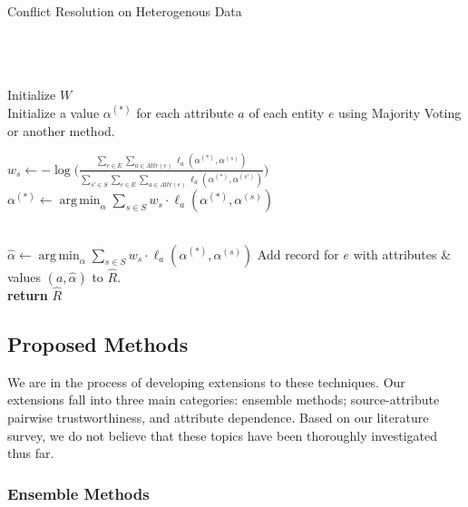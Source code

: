 \documentclass{acm_proc_article-sp}
\DeclareMathOperator*{\argmin}{arg\,min}
\begin{document}
\begin{algorithm}
\small
\caption{Conflict Resolution on Heterogenous Data}
\begin{algorithmic}[1]
 \\
 \\
 \\

\State Initialize $W$ \\

\State Initialize a value $\alpha^(*)$ for each attribute $a$ of each entity $e$ using Majority Voting or another method. 

\State $w_s \leftarrow - \log \big ( \frac{\sum_{e \in E} \sum_{a \in Attr(e)} \ell_a(\alpha^{(*)}, \alpha^{(s)})}{\sum_{s' \in S} \sum_{e \in E}  \sum_{a \in Attr(e)} \ell_a(\alpha^{(*)}, \alpha^{(s')})} \big )$
\State $\alpha^{(*)} \leftarrow \argmin_\alpha \sum_{s \in S} w_s \cdot \ell_a(\alpha^{(*)}, \alpha^{(s)})$
\EndFor
\EndFor
\EndWhile

\\

\State $\hat{\alpha} \leftarrow \argmin_\alpha \sum_{s \in S} w_s \cdot \ell_a(\alpha^{(*)}, \alpha^{(s)})$
\EndFor
\State Add record for $e$ with attributes \& values $(a, \hat{\alpha})$ to $\hat{R}$.
\EndFor
\\

\State \textbf{return} $\hat{R}$
\EndFunction
\end{algorithmic}
\label{alg:crh}
\end{algorithm}  


\subsection{Proposed Methods}

We are in the process of developing extensions to these techniques. Our extensions fall into three main categories: ensemble methods; source-attribute pairwise trustworthiness, and attribute dependence. Based on our literature survey, we do not believe that these topics have been thoroughly investigated thus far. 


\subsubsection{Ensemble Methods}
\end{document}
